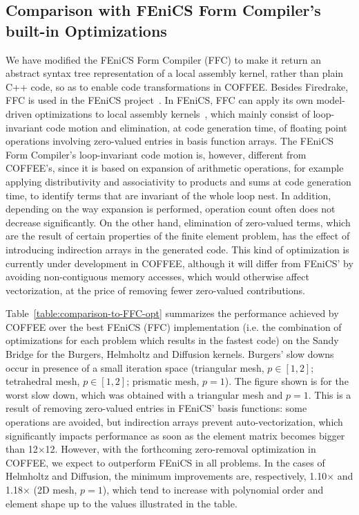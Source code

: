 \documentclass[conference]{IEEEtran}
\begin{document}
\subsection{Comparison with FEniCS Form Compiler's built-in Optimizations}
\label{sec:perf-results-fenics}
We have modified the FEniCS Form Compiler (FFC) to make it return an abstract syntax tree representation of a local assembly kernel, rather than plain C++ code, so as to enable code transformations in COFFEE. Besides Firedrake, FFC is used in the FEniCS project~\cite{Fenics}. In FEniCS, FFC can apply its own model-driven optimizations to local assembly kernels~\cite{quadrature1}, which mainly consist of loop-invariant code motion and elimination, at code generation time, of floating point operations involving zero-valued entries in basis function arrays. The FEniCS Form Compiler's loop-invariant code motion is, however, different from COFFEE's, since it is based on expansion of arithmetic operations, for example applying distributivity and associativity to products and sums at code generation time, to identify terms that are invariant of the whole loop nest. In addition, depending on the way expansion is performed, operation count often does not decrease significantly. On the other hand, elimination of zero-valued terms, which are the result of certain properties of the finite element problem, has the effect of introducing indirection arrays in the generated code. This kind of optimization is currently under development in COFFEE, although it will differ from FEniCS' by avoiding non-contiguous memory accesses, which would otherwise affect vectorization, at the price of removing fewer zero-valued contributions.

Table~\ref{table:comparison-to-FFC-opt} summarizes the performance achieved by COFFEE over the best FEniCS (FFC) implementation (i.e. the combination of optimizations for each problem which results in the fastest code) on the Sandy Bridge for the Burgers, Helmholtz and Diffusion kernels. Burgers' slow downs occur in presence of a small iteration space (triangular mesh, $p \in [1, 2]$; tetrahedral mesh, $p \in [1, 2]$; prismatic mesh, $p = 1$). The figure shown is for the worst slow down, which was obtained with a triangular mesh and $p = 1$. This is a result of removing zero-valued entries in FEniCS' basis functions: some operations are avoided, but indirection arrays prevent auto-vectorization, which significantly impacts performance as soon as the element matrix becomes bigger than 12$\times$12. However, with the forthcoming zero-removal optimization in COFFEE, we expect to outperform FEniCS in all problems. In the cases of Helmholtz and Diffusion, the minimum improvements are, respectively, 1.10$\times$ and 1.18$\times$ (2D mesh, $p=1$), which tend to increase with polynomial order and element shape up to the values illustrated in the table.
\end{document}

